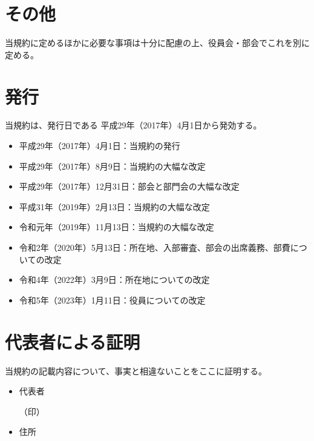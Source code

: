 \documentclass[12pt, unicode, a4paper]{ltjsreport}
\begin{document}
    \section*{その他}
        当規約に定めるほかに必要な事項は十分に配慮の上、役員会・部会でこれを別に定める。

    \section*{発行}
        当規約は、発行日である 平成29年（2017年）4月1日から発効する。
        \begin{itemize}
            \item 平成29年（2017年）4月1日：当規約の発行
            \item 平成29年（2017年）8月9日：当規約の大幅な改定
            \item 平成29年（2017年）12月31日：部会と部門会の大幅な改定
            \item 平成31年（2019年）2月13日：当規約の大幅な改定
            \item 令和元年（2019年）11月13日：当規約の大幅な改定
            \item 令和2年（2020年）5月13日：所在地、入部審査、部会の出席義務、部費についての改定
            \item 令和4年（2022年）3月9日：所在地についての改定
            \item 令和5年（2023年）1月11日：役員についての改定
        \end{itemize}

    \section*{代表者による証明}
        当規約の記載内容について、事実と相違ないことをここに証明する。
        \begin{itemize}
            \item 代表者
            \begin{flushright}
                （印）
            \end{flushright}
            \item 住所
        \end{itemize}
\end{document}
